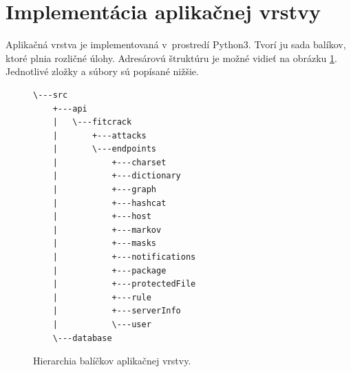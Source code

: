 \documentclass[zadani,slovak]{fitthesis}
\begin{document}
\section{Implementácia aplikačnej vrstvy}
Aplikačná vrstva je implementovaná v~prostredí Python3. Tvorí ju sada balíkov, ktoré plnia rozličné úlohy. Adresárovú štruktúru je možné vidieť na obrázku \ref{fig:serverStructure}. Jednotlivé zložky a súbory sú popísané nižšie.
\begin{figure}[H]
\begin{center}
\begin{varwidth}{\linewidth}
\begin{verbatim}
\---src
    +---api
    |   \---fitcrack
    |       +---attacks
    |       \---endpoints
    |           +---charset
    |           +---dictionary
    |           +---graph
    |           +---hashcat
    |           +---host
    |           +---markov
    |           +---masks
    |           +---notifications
    |           +---package
    |           +---protectedFile
    |           +---rule
    |           +---serverInfo
    |           \---user
    \---database
\end{verbatim}
\end{varwidth}
\end{center}
\caption{Hierarchia balíčkov aplikačnej vrstvy.}
\label{fig:serverStructure}
\end{figure}
\noindent
\end{document}
